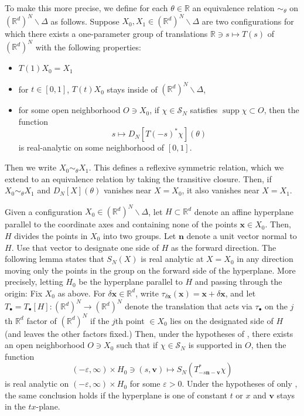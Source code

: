\documentclass[11pt, letterpaper, reqno]{amsart}
\theoremstyle{definition}
\newenvironment{lemma}
{\pushQED{\qed}\renewcommand{\qedsymbol}{$\blacksquare$}\lemmax}
{\popQED\endlemmax}
\theoremstyle{remark}
\newcommand{\bbR}{\mathbb{R}}
\newcommand{\calS}{\mathcal{S}}
\newcommand{\bfn}{\mathbf{n}}
\newcommand{\bfv}{\mathbf{v}}
\newcommand{\bfx}{\mathbf{x}}
\begin{document}
To make this more precise, we define for each $\theta \in \bbR$ an equivalence relation $\sim_\theta$ on $(\bbR^d)^N\backslash \Delta$ as follows. Suppose $X_0,X_1 \in (\bbR^d)^N\backslash \Delta$ are two configurations for which there exists a one-parameter group of translations $\bbR\ni s\mapsto T(s)$ of $(\bbR^d)^N$ with the following properties:
\begin{itemize}
    \item $T(1) X_0= X_1$
    \item for $t\in [0,1]$, $T(t)X_0$ stays inside of $(\bbR^d)^N\backslash \Delta$, 
    \item  for some open neighborhood $O\ni X_0$, if $\chi\in \calS_N$ satisfies $\operatorname{supp} \chi \subset O$, then the function 
    \begin{equation}
        s\mapsto D_N[T(-s)^* \chi](\theta) 
    \end{equation}
    is real-analytic on some neighborhood of $[0,1]$. 
\end{itemize}
Then we write $X_0\sim_\theta X_1$. This defines a reflexive symmetric relation, which we extend to an equivalence relation by taking the transitive closure. Then, if $X_0\sim_\theta X_1$ and $D_N[X](\theta)$ vanishes near $X=X_0$, it also vanishes near $X=X_1$. 


 
Given a configuration $X_0\in (\bbR^d)^N\backslash \Delta$, let
$H\subset\bbR^d$ denote an affine hyperplane parallel to the coordinate axes and containing none of the points $\bfx\in X_0$. Then, $H$ divides the points in $X_0$ into two groups. Let $\bfn$ denote a unit vector normal to $H$. Use that vector to designate one side of $H$ as the forward direction.
The following lemma states that $S_N(X)$ is real analytic at $X=X_0$ in any direction moving only the points in the group on the forward side of the hyperplane. More precisely, letting $H_0$ be the hyperplane parallel to $H$ and passing through the origin:
\begin{lemma}\label{lem:reduction} 
Fix $X_0$ as above. 
For $\delta\bfx\in\bbR^d$, write
$\tau_{\delta\bfx}(\bfx)=\bfx+\delta\bfx$, and let $T_{\bullet}=T_\bullet[H]:(\bbR^d)^N\to (\bbR^d)^N$ denote the translation that acts via $\tau_{\bullet}$ on the $j$th $\bbR^d$ factor of $(\bbR^d)^N$ if the $j$th point $\in X_0$ lies on the designated side of $H$ (and leaves the other factors fixed.) Then, under the hypotheses of ,  there exists an open neighborhood $O\ni X_0$ such that if $\chi\in \calS_N$ is supported in $O$, then the function 
\begin{equation}
    (-\varepsilon,\infty) \times H_0\ni (s, \bfv) \mapsto S_N(T^*_{-s \bfn - \bfv } \chi)
\end{equation}
is real analytic on $(-\varepsilon, \infty)\times H_0$ for some $\varepsilon>0$. 
Under the hypotheses of only , the same conclusion holds if the hyperplane is one of constant $t$ or $x$ and $\bfv$ stays in the $tx$-plane. 
\end{lemma}
\end{document}
